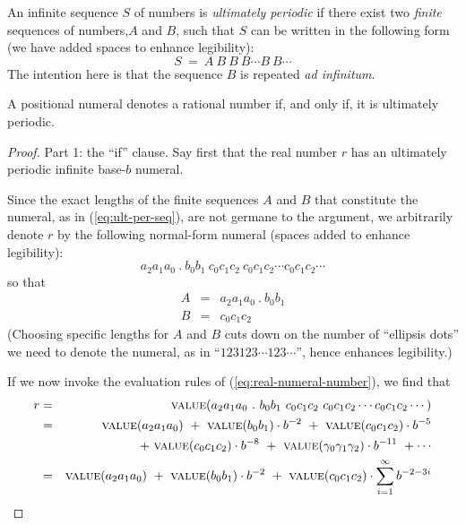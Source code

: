 An infinite sequence $S$ of numbers is {\em ultimately periodic} if
there exist two {\em finite} sequences of numbers,$A$ and $B$, such
that $S$ can be written in the following form (we have added spaces to
enhance legibility):
\begin{equation}
\label{eq:ult-per-seq}
 S \ = \ A \ B \ B \ B \cdots B \ B \cdots
\end{equation}
The intention here is that the sequence $B$ is repeated {\it ad
  infinitum}.


\begin{prop}
\label{thm:rational-real}
A positional numeral denotes a rational number if, and only if, it is
ultimately periodic.
\end{prop}

\begin{proof}
{\small\sf Part 1: the ``if'' clause.}
Say first that the real number $r$ has an ultimately periodic infinite
base-$b$ numeral.

Since the exact lengths of the finite sequences $A$ and $B$ that
constitute the numeral, as in (\ref{eq:ult-per-seq}), are not germane
to the argument, we arbitrarily denote $r$ by the following
normal-form numeral (spaces added to enhance legibility):
\[  a_2 a_1 a_0 \ . \ b_0 b_1 \
c_0 c_1 c_2 \
c_0 c_1 c_2
\cdots
c_0 c_1 c_2
\cdots
\]
so that
\begin{eqnarray*}
A & = & a_2 a_1 a_0 \ . \ b_0 b_1 \\
B & = & c_0 c_1 c_2
\end{eqnarray*}
(Choosing specific lengths for $A$ and $B$ cuts down on the number of
``ellipsis dots'' we need to denote the numeral, as in ``$123 123
\cdots 123 \cdots$'', hence enhances legibility.)

If we now invoke the evaluation rules of (\ref{eq:real-numeral-number}),
we find that
\begin{eqnarray}
\nonumber
r & = &
\mbox{\sc value}(a_2 a_1 a_0 \ . \ b_0 b_1 \
c_0 c_1 c_2 \
c_0 c_1 c_2
\cdots
c_0 c_1 c_2
\cdots) \\
\nonumber
  & = &
\mbox{\sc value}(a_2 a_1 a_0)
 \ + \ \mbox{\sc value}(b_0 b_1) \cdot b^{-2}
 \ + \
\mbox{\sc value}(c_0 c_1 c_2) \cdot b^{-5} \\
\label{eq:sum-in-numeral}
  &  &
 \ + \
\mbox{\sc value}(c_0 c_1 c_2) \cdot b^{-8}
 \ + \
\mbox{\sc value}(\gamma_0 \gamma_1 \gamma_2) \cdot b^{-11}
\ + \cdots \\
\nonumber
  & = &
\mbox{\sc value}(a_2 a_1 a_0)
 \ + \ \mbox{\sc value}(b_0 b_1) \cdot b^{-2}
 \ + \
\mbox{\sc value}(c_0 c_1 c_2) \cdot \sum_{i=1}^\infty b^{-2-3i}
\end{eqnarray}


\end{proof}
